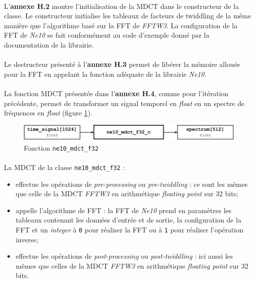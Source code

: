 \documentclass{article}
\begin{document}
    \paragraph{}
    L'\textbf{annexe H.2} montre l'initialisation de la MDCT dans le constructeur de la classe. Le constructeur initialise les tableaux de facteurs de twiddling de la même manière que l'algorithme basé sur la FFT de \emph{FFTW3}. La configuration de la FFT de \emph{Ne10} se fait conformément au code d'exemple donné par la documentation de la librairie\cite{Ne10}.

    \paragraph{}
    Le destructeur présenté à l'\textbf{annexe H.3} permet de libérer la mémoire allouée pour la FFT en appelant la fonction adéquate de la librairie \emph{Ne10}.

    \paragraph{}
    La fonction MDCT présentée dans l'\textbf{annexe H.4}, comme pour l'itération précédente, permet de transformer un signal temporel en \emph{float} en un spectre de fréquences en \emph{float} (figure \ref{fig:func_ne10_mdct_f32}).
    \begin{figure}[H]
        \centering
        \includegraphics[width=.8\linewidth]{./images/func_ne10_mdct_f32_c.pdf}
        \caption{Fonction \texttt{ne10\_mdct\_f32}}
        \label{fig:func_ne10_mdct_f32}
    \end{figure}

    \paragraph{}
    La MDCT de la classe \texttt{ne10\_mdct\_f32} :
    \begin{itemize}
        \item effectue les opérations de \emph{pre-processing} ou \emph{pre-twiddling} : ce sont les mêmes que celle de la MDCT \emph{FFTW3} en arithmétique \emph{floating point} sur 32 bits;
        \item appelle l'algorithme de FFT : la FFT de \emph{Ne10} prend en paramètres les tableaux contenant les données d'entrée et de sortie, la configuration de la FFT et un \emph{integer} à \texttt{0} pour réaliser la FFT ou à \texttt{1} pour réaliser l'opération inverse;
        \item effectue les opérations de \emph{post-processing} ou \emph{post-twiddling} : ici aussi les mêmes que celles de la MDCT \emph{FFTW3} en arithmétique \emph{floating point} sur 32 bits.
    \end{itemize}
\end{document}
